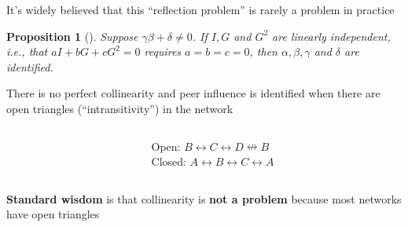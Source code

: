 \documentclass[aspectratio=169]{beamer}
\newtheorem{proposition}{Proposition}
\theoremstyle{remark}
\begin{document}
\begin{frame}{It's widely believed that this ``reflection problem'' is rarely a problem in practice}
    
    \begin{proposition}[\citealt{bramoulle2009}]
        Suppose $\gamma \beta + \delta \neq 0$. If $I, G$ and $G^2$ are linearly independent, i.e., that $a I + b G + c G^2 = 0$ requires $a = b = c = 0$, then $\alpha, \beta, \gamma$ and $\delta$ are identified.
    \end{proposition}
    
    There is no perfect collinearity and peer influence is identified when there are \textcolor{Mahogany}{open triangles} (``intransitivity'') in the network
    \begin{columns}
        \begin{column}{0.5\textwidth}
            \centering
        \end{column}
        \begin{column}{0.5\textwidth}
            \centering
            Open: \textcolor{Mahogany}{$B \leftrightarrow C \leftrightarrow D \nleftrightarrow B$} \\
            Closed: $A \leftrightarrow B \leftrightarrow C \leftrightarrow A$
        \end{column}
    \end{columns}
    \vspace{2mm}
    \textbf{Standard wisdom} is that collinearity is \textbf{not a problem} because most networks have open triangles
\end{frame}
\end{document}
